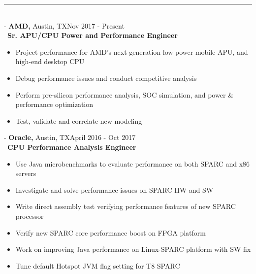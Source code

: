 \documentclass[12pt]{res}
\begin{document}
\begin{resume}
\vspace{-10pt}
\rule{18cm}{0.5mm}\\
 -\sectionwidth \resumewidth
{\textbf{AMD,}  Austin, TX\hfill Nov 2017 - Present} \hspace{-0.58in}\vspace{-0mm}\\\
  \textbf{Sr. APU/CPU Power and Performance Engineer} \\
 \vspace{-14pt}
 \begin{itemize}[leftmargin=-0.1in]
   \item Project performance for AMD's next generation low power mobile APU, and high-end desktop CPU \vspace{-4pt}
   \item Debug performance issues and conduct competitive analysis  \vspace{-4pt}
   \item Perform pre-silicon performance analysis, SOC simulation, and power \& performance optimization \vspace{-4pt}
   \item Test, validate and correlate new modeling \vspace{-4pt}
  \end{itemize}
\vspace{-10pt}

 -\sectionwidth \resumewidth
{\textbf{Oracle,}  Austin, TX\hfill April 2016 - Oct 2017} \hspace{-0.58in}\vspace{-0mm}\\\
  \textbf{CPU Performance Analysis Engineer} \\
 \vspace{-14pt}
 \begin{itemize}[leftmargin=-0.1in]
   \item Use Java microbenchmarks to evaluate performance on both SPARC and x86 servers\vspace{-4pt}
   \item Investigate and solve performance issues on SPARC HW and SW  \vspace{-4pt}
   \item Write direct assembly test verifying performance features of new SPARC processor \vspace{-4pt}
   \item Verify new SPARC core performance boost on FPGA platform \vspace{-4pt}
   \item Work on improving Java performance on Linux-SPARC platform with SW fix\vspace{-4pt}
   \item Tune default Hotspot JVM flag setting for T8 SPARC \vspace{-4pt}
 \end{itemize}


\end{resume}
\end{document}
